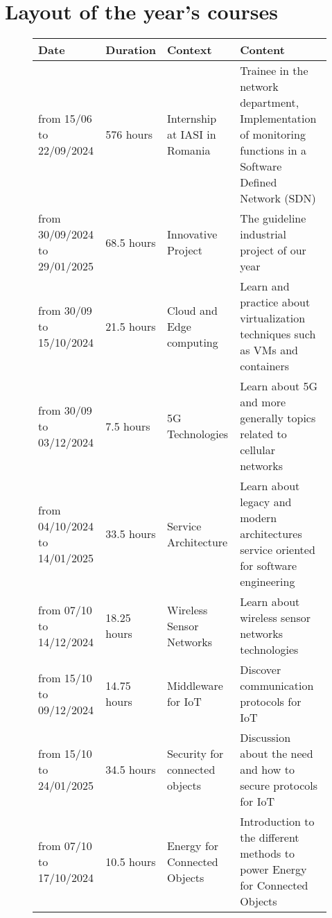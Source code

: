\section{Layout of the year's courses}
\begin{figure}[H]
    \centering
    \begin{tabular}{|C{2cm}|C{2cm}|C{4cm}|C{6cm}|}
        \hline
        \textbf{Date} & \textbf{Duration} & \textbf{Context} & \textbf{Content} \\
        \hline
        from 15/06 to 22/09/2024 & 576 hours & Internship at IASI in Romania & Trainee in the network department, Implementation of monitoring functions in a Software Defined Network (SDN) \\
        \hline
        from 30/09/2024 to 29/01/2025 & 68.5 hours & Innovative Project & The guideline industrial project of our year \\
        \hline
        from 30/09 to 15/10/2024 & 21.5 hours & Cloud and Edge computing & Learn and practice about virtualization techniques such as VMs and containers \\
        \hline
        from 30/09 to 03/12/2024 & 7.5 hours & 5G Technologies & Learn about 5G and more generally topics related to cellular networks \\
        \hline
        from 04/10/2024 to 14/01/2025 & 33.5 hours & Service Architecture & Learn about legacy and modern architectures service oriented for software engineering \\
        \hline
        from 07/10 to 14/12/2024 & 18.25 hours & Wireless Sensor Networks & Learn about wireless sensor networks technologies \\
        \hline
        from 15/10 to 09/12/2024 & 14.75 hours & Middleware for IoT & Discover communication protocols for IoT \\
        \hline
        from 15/10 to 24/01/2025 & 34.5 hours & Security for connected objects & Discussion about the need and how to secure protocols for IoT \\
        \hline
        from 07/10 to 17/10/2024 & 10.5 hours & Energy for Connected Objects & Introduction to the different methods to power Energy for Connected Objects \\
        \hline
        
    \end{tabular}
\end{figure}


